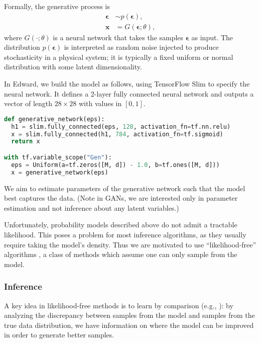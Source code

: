 Formally, the generative process is
\begin{align*}
\mathbf{\epsilon} &\sim p(\mathbf{\epsilon}), \\
\mathbf{x} &= G(\mathbf{\epsilon}; \theta),
\end{align*}
where $G(\cdot; \theta)$ is a neural network that takes the samples
$\mathbf{\epsilon}$ as input. The distribution
$p(\mathbf{\epsilon})$ is interpreted as random noise injected to
produce stochasticity in a physical system; it is typically a fixed
uniform or normal distribution with some latent dimensionality.

In Edward, we build the model as follows, using TensorFlow Slim to
specify the neural network. It defines a 2-layer fully connected neural
network and outputs a vector of length $28\times28$ with values in
$[0,1]$.

\begin{lstlisting}[language=Python]
def generative_network(eps):
  h1 = slim.fully_connected(eps, 128, activation_fn=tf.nn.relu)
  x = slim.fully_connected(h1, 784, activation_fn=tf.sigmoid)
  return x

with tf.variable_scope("Gen"):
  eps = Uniform(a=tf.zeros([M, d]) - 1.0, b=tf.ones([M, d]))
  x = generative_network(eps)
\end{lstlisting}

We aim to estimate parameters of the generative network such
that the model best captures the data. (Note in GANs, we are
interested only in parameter estimation and not inference about any
latent variables.)

Unfortunately, probability models described above do not admit a tractable
likelihood. This poses a problem for most inference algorithms, as
they usually require taking the model's density.  Thus we are
motivated to use ``likelihood-free'' algorithms
\citep{marin2012approximate}, a class of methods which assume one
can only sample from the model.

\subsubsection{Inference}

A key idea in likelihood-free methods is to learn by
comparison (e.g., \citet{rubin1984bayesianly,gretton2012kernel}): by
analyzing the discrepancy between samples from the model and samples
from the true data distribution, we have information on where the
model can be improved in order to generate better samples.

